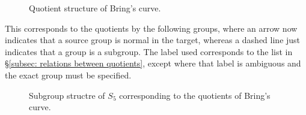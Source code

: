 \documentclass{amsart}
\newcommand{\pbrace}[1]{\left\{ #1 \right\} }
\newcommand{\pangle}[1]{\left\langle #1 \right\rangle}
\begin{document}
\begin{center}
\begin{figure}[H]
    \caption{Quotient structure of Bring's curve.}
    \label{eq: structure of quotient curves}
\end{figure}
\end{center}

This corresponds to the quotients by the following groups, where an arrow now indicates that a source group is normal in the target, whereas a dashed line just indicates that a group is a subgroup. The label used corresponds to the list in \S\ref{subsec: relations between quotients}, except where that label is ambiguous and the exact group must be specified.

\begin{center}
\begin{figure}[H]
    \caption{Subgroup structre of $S_5$ corresponding to the quotients of Bring's curve.}
    \label{eq: structure of quotient groups}
\end{figure}
\end{center}
\end{document}

